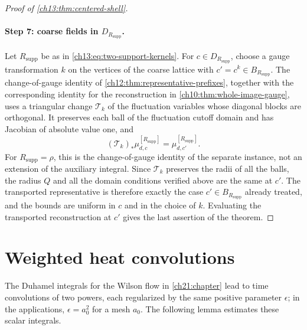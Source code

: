 \begin{proof}[Proof of \cref{ch13:thm:centered-shell}]
\paragraph{Step 7: coarse fields in $D_{R_{\mathrm{supp}}}$.}
Let $R_{\mathrm{supp}}$ be as in \eqref{ch13:eq:two-support-kernels}. For $c\in D_{R_{\mathrm{supp}}}$, choose a gauge transformation $k$ on the vertices of the coarse lattice with $c'=c^k\in B_{R_{\mathrm{supp}}}$. The change-of-gauge identity of \cref{ch12:thm:representative-prefixes}, together with the corresponding identity for the reconstruction in \cref{ch10:thm:whole-image-gauge}, uses a triangular change $\mathcal T_k$ of the fluctuation variables whose diagonal blocks are orthogonal. It preserves each ball of the fluctuation cutoff domain and has Jacobian of absolute value one, and
\[
 (\mathcal T_k)_*\mu_{d,c}^{[R_{\mathrm{supp}}]}=\mu_{d,c'}^{[R_{\mathrm{supp}}]}.
\]
For $R_{\mathrm{supp}}=\rho$, this is the change-of-gauge identity of the separate instance, not an extension of the auxiliary integral. Since $\mathcal T_k$ preserves the radii of all the balls, the radius $Q$ and all the domain conditions verified above are the same at $c'$. The transported representative is therefore exactly the case $c'\in B_{R_{\mathrm{supp}}}$ already treated, and the bounds are uniform in $c$ and in the choice of $k$. Evaluating the transported reconstruction at $c'$ gives the last assertion of the theorem.
\end{proof}

\section{Weighted heat convolutions}\label{ch13:sec:convolution}

The Duhamel integrals for the Wilson flow in \cref{ch21:chapter} lead to time convolutions of two powers, each regularized by the same positive parameter $\epsilon$; in the applications, $\epsilon=a_0^2$ for a mesh $a_0$. The following lemma estimates these scalar integrals.

